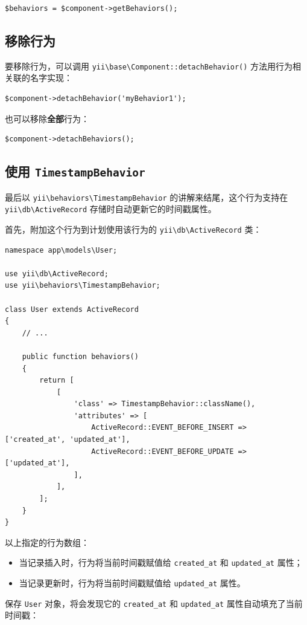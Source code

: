 \lstset{language=php}\begin{lstlisting}
$behaviors = $component->getBehaviors();
\end{lstlisting}
\subsection{移除行为}
要移除行为，可以调用 \texttt{yii{\allowbreak{}\textbackslash}base{\allowbreak{}\textbackslash}Component\allowbreak{}::\allowbreak{}detachBehavior()} 方法用行为相关联的名字实现：

\lstset{language=php}\begin{lstlisting}
$component->detachBehavior('myBehavior1');
\end{lstlisting}
也可以移除\textbf{全部}行为：

\lstset{language=php}\begin{lstlisting}
$component->detachBehaviors();
\end{lstlisting}
\subsection{使用 \lstinline|TimestampBehavior|}
最后以 \texttt{yii{\allowbreak{}\textbackslash}behaviors{\allowbreak{}\textbackslash}TimestampBehavior} 的讲解来结尾，这个行为支持在 \texttt{yii{\allowbreak{}\textbackslash}db{\allowbreak{}\textbackslash}ActiveRecord} 存储时自动更新它的时间戳属性。

首先，附加这个行为到计划使用该行为的 \texttt{yii{\allowbreak{}\textbackslash}db{\allowbreak{}\textbackslash}ActiveRecord} 类：

\lstset{language=php}\begin{lstlisting}
namespace app\models\User;

use yii\db\ActiveRecord;
use yii\behaviors\TimestampBehavior;

class User extends ActiveRecord
{
    // ...

    public function behaviors()
    {
        return [
            [
                'class' => TimestampBehavior::className(),
                'attributes' => [
                    ActiveRecord::EVENT_BEFORE_INSERT => ['created_at', 'updated_at'],
                    ActiveRecord::EVENT_BEFORE_UPDATE => ['updated_at'],
                ],
            ],
        ];
    }
}
\end{lstlisting}
以上指定的行为数组：

\begin{itemize}
\item 当记录插入时，行为将当前时间戳赋值给 \lstinline|created_at| 和 \lstinline|updated_at| 属性；
\item 当记录更新时，行为将当前时间戳赋值给 \lstinline|updated_at| 属性。
\end{itemize}
保存 \lstinline|User| 对象，将会发现它的 \lstinline|created_at| 和 \lstinline|updated_at| 属性自动填充了当前时间戳：

